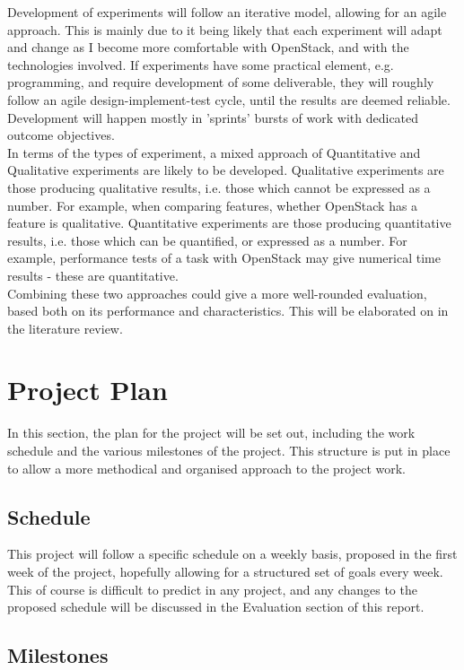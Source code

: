 Development of experiments will follow an iterative model, allowing for an agile approach. This is mainly due to it being likely that each experiment will adapt and change as I become more comfortable with OpenStack, and with the technologies involved. If experiments have some practical element, e.g. programming, and require development of some deliverable, they will roughly follow an agile design-implement-test cycle, until the results are deemed reliable. Development will happen mostly in 'sprints' bursts of work with dedicated outcome objectives.\\
In terms of the types of experiment, a mixed approach of Quantitative and Qualitative experiments are likely to be developed. Qualitative experiments are those producing qualitative results, i.e. those which cannot be expressed as a number\cite{qualquantdef}. For example, when comparing features, whether OpenStack has a feature is qualitative. Quantitative experiments are those producing quantitative results, i.e. those which can be quantified, or expressed as a number\cite{qualquantdef}. For example, performance tests of a task with OpenStack may give numerical time results - these are quantitative. \\
Combining these two approaches could give a more well-rounded evaluation, based both on its performance and characteristics. This will be elaborated on in the literature review. 

\section{Project Plan}
In this section, the plan for the project will be set out, including the work schedule and the various milestones of the project. This structure is put in place to allow a more methodical and organised approach to the project work. 

\subsection{Schedule}

This project will follow a specific schedule on a weekly basis, proposed in the first week of the project, hopefully allowing for a structured set of goals every week. This of course is difficult to predict in any project, and any changes to the proposed schedule will be discussed in the Evaluation section of this report.  

\subsection{Milestones}

